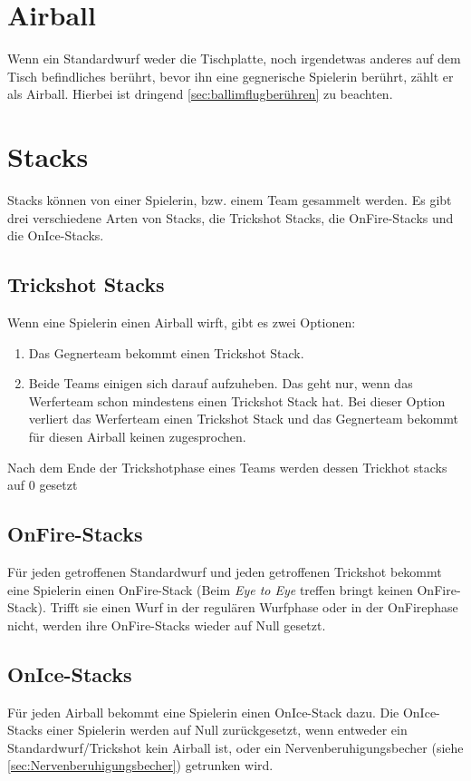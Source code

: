 \documentclass[a5paper, 12pt]{book}
\begin{document}
\section{Airball}\label{sec:Airball}
Wenn ein Standardwurf weder die Tischplatte, noch irgendetwas anderes auf dem Tisch befindliches berührt, bevor ihn eine gegnerische Spielerin berührt, zählt er als Airball. Hierbei ist dringend \ref{sec:ballimflugberühren} zu beachten. 
\section{Stacks}\label{sec:stacks}
Stacks können von einer Spielerin, bzw. einem Team gesammelt werden. Es gibt drei verschiedene Arten von Stacks, die Trickshot Stacks, die OnFire-Stacks und die OnIce-Stacks.
\subsection{Trickshot Stacks}\label{sub:trickshotstacks}
Wenn eine Spielerin einen Airball wirft, gibt es zwei Optionen:
\begin{enumerate} [(1)]
    \item Das Gegnerteam bekommt einen Trickshot Stack.
    \item Beide Teams einigen sich darauf aufzuheben. Das geht nur, wenn das Werferteam schon mindestens einen Trickshot Stack hat. Bei dieser Option verliert das Werferteam einen Trickshot Stack und das Gegnerteam bekommt für diesen Airball keinen zugesprochen. 
\end{enumerate}
Nach dem Ende der Trickshotphase eines Teams werden dessen Trickhot stacks auf 0 gesetzt
\subsection{OnFire-Stacks}\label{sub:onfirestacks}
Für jeden getroffenen Standardwurf und jeden getroffenen Trickshot bekommt eine Spielerin einen OnFire-Stack (Beim \textit{ Eye to Eye} treffen bringt keinen OnFire-Stack). Trifft sie einen Wurf in der regulären Wurfphase oder in der OnFirephase nicht, werden ihre OnFire-Stacks wieder auf Null gesetzt.
\subsection{OnIce-Stacks}\label{sub:onicestacks}
Für jeden Airball bekommt eine Spielerin einen OnIce-Stack dazu. Die OnIce-Stacks einer Spielerin werden auf Null zurückgesetzt, wenn entweder ein Standardwurf/Trickshot kein Airball ist, oder ein Nervenberuhigungsbecher (siehe \ref{sec:Nervenberuhigungsbecher}) getrunken wird. 
\end{document}
